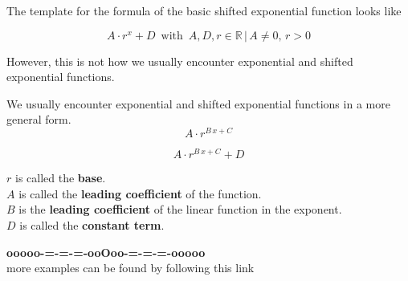 \documentclass{ximera}
\begin{document}
The template for the formula of the basic shifted exponential function looks like



\[  A \cdot r^x + D   \, \text{ with } \,  A, D, r \in \mathbb{R} \, | \,  A \ne 0, \, r > 0   \]




However, this is not how we usually encounter exponential and shifted exponential functions.  


\begin{template}

We usually encounter exponential and shifted exponential functions in a more general form. \\




\[  A \cdot r^{B \, x + C}     \]


\[  A \cdot r^{B \, x + C} + D    \]



\end{template}




$r$ is called the \textbf{base}. \\
$A$ is called the \textbf{leading coefficient} of the function. \\
$B$ is the \textbf{leading coefficient} of the linear function in the exponent. \\
$D$ is called the \textbf{constant term}. \\














\begin{center}
\textbf{\textcolor{green!50!black}{ooooo-=-=-=-ooOoo-=-=-=-ooooo}} \\

more examples can be found by following this link\\ 

\end{center}
\end{document}
